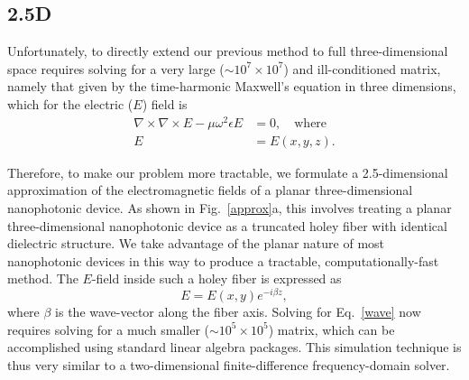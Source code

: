 %  
% 
% 
\subsection{2.5D}
Unfortunately, to directly extend our previous method to full three-dimensional space requires solving for a very large ($\sim 10^7 \times 10^7$) and ill-conditioned matrix, namely that given by the time-harmonic Maxwell's equation in three dimensions, which for the electric ($E$) field is
\begin{align}
\nabla\times\nabla\times E - \mu\omega^2\epsilon E &= 0,\quad\text{where}\label{wave} \\
E &= E(x,y,z).
\end{align}

Therefore, to make our problem more tractable, we formulate a 2.5-dimensional approximation of the electromagnetic fields of a planar three-dimensional nanophotonic device\cite{Lu11}. As shown in Fig.~\ref{approx}a, this involves treating a planar three-dimensional nanophotonic device as a truncated holey fiber with identical dielectric structure. We take advantage of the planar nature of most nanophotonic devices in this way to produce a tractable, computationally-fast method. The $E$-field inside such a holey fiber is expressed as
\begin{equation}
E = E(x,y)e^{-i\beta z},
\end{equation}
where $\beta$ is the wave-vector along the fiber axis. Solving for Eq.~\ref{wave} now requires solving for a much smaller ($\sim 10^5 \times 10^5$) matrix, which can be accomplished using standard linear algebra packages. This simulation technique is thus very similar to a two-dimensional finite-difference frequency-domain solver.

